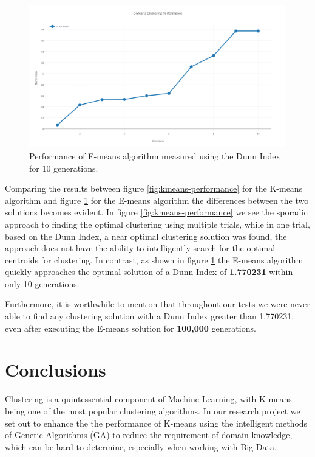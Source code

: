 \documentclass{article}
\newcommand{\bold}[1]{\textbf{#1}}
\begin{document}
\begin{figure}[H]
\centering
\includegraphics[width=\textwidth]{figures/emeans-performance}
\caption{Performance of E-means algorithm measured using the Dunn Index for 10 generations.}
\label{fig:emeans-performance}
\end{figure}


Comparing the results between figure \ref{fig:kmeans-performance} for the K-means algorithm and figure \ref{fig:emeans-performance} for the E-means algorithm the differences between the two solutions becomes evident. In figure \ref{fig:kmeans-performance} we see the sporadic approach to finding the optimal clustering using multiple trials, while in one trial, based on the Dunn Index, a near optimal clustering solution was found, the approach does not have the ability to intelligently search for the optimal centroids for clustering. In contrast, as shown in figure \ref{fig:emeans-performance} the E-means algorithm quickly approaches the optimal solution of a Dunn Index of \bold{1.770231} within only 10 generations.

Furthermore, it is worthwhile to mention that throughout our tests we were never able to find any clustering solution with a Dunn Index greater than 1.770231, even after executing the E-means solution for \bold{100,000} generations.



\section{Conclusions}

Clustering is a quintessential component of Machine Learning, with K-means being one of the most popular clustering algorithms. In our research project we set out to enhance the the performance of K-means using the intelligent methods of Genetic Algorithms (GA) to reduce the requirement of domain knowledge, which can be hard to determine, especially when working with Big Data.
\end{document}
